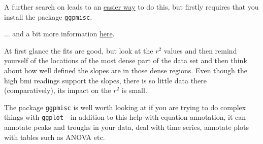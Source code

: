 \documentclass[titlepage]{book}\usepackage{knitr}
\begin{document}
A further search on  leads to an \href{http://stackoverflow.com/questions/7549694/ggplot2-adding-regression-line-equation-and-r2-on-graph}{easier way} to do this, but firstly requires that you install the package \texttt{ggpmisc}.


\begin{knitrout}
\color{fgcolor}\begin{kframe}
\begin{alltt}
\hlstd{(}\hlstd{,}  \hlstd{=} \hlstd{,}  \hlstd{=} \hlstd{,}  \hlstd{=} \hlstd{)}
 \hlkwb{<-}  \hlopt{~} 
 \hlkwb{<-} \hlstd{(}  \hlstd{(}         \hlstd{=} \hlstd{))} \hlopt{+}
  \hlstd{(} \hlstd{=} \hlstd{,} \hlstd{=}\hlstd{)} \hlopt{+} \hlstd{(}\hlstd{,}\hlstd{)} \hlopt{+}
  \hlstd{(} 
               \hlstd{(} \hlstd{=}   \hlstd{=} \hlstd{,}\hlstd{=}\hlstd{,} \hlstd{=}\hlstd{),} \hlstd{=}\hlstd{),}
                \hlstd{=} \hlstd{)} \hlopt{+}
  \hlstd{()}\hlopt{+} \hlopt{~}
\hlstd{()}
\end{alltt}
\end{kframe}
\end{knitrout}

... and a bit more information \href{https://stackoverflow.com/questions/19699858/ggplot-adding-regression-line-equation-and-r2-with-facet}{here}.


At first glance the fits are good, but look at the $r^2$ values and then remind yourself of the locations of the most dense part of the data set and then think about how well defined the slopes are in those dense regions.  Even though the high bmi readings support the slopes, there is so little data there (comparatively), its impact on the $r^2$ is small.

The package \texttt{ggpmisc} is well worth looking at if you are trying to do complex things with \texttt{ggplot} - in addition to this help with equation annotation, it can annotate peaks and troughs in your data, deal with time series, annotate plots with tables such as ANOVA etc.
\end{document}
